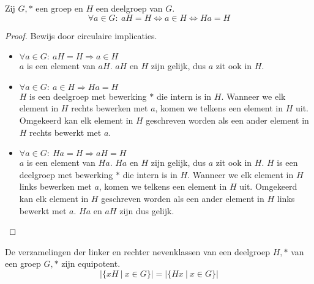 \documentclass[main.tex]{subfiles}
\begin{document}
\begin{ei}
  \label{ei:nevenklasse-eigen-element-gelijk}
  Zij $G,*$ een groep en $H$ een deelgroep van $G$.
  \[ \forall a \in G:\ aH = H \Leftrightarrow a \in H \Leftrightarrow Ha = H \]

  \begin{proof}
    Bewijs door circulaire implicaties.
    \begin{itemize}
    \item $\forall a \in G:\ aH = H \Rightarrow a \in H$\\
      $a$ is een element van $aH$. $aH$ en $H$ zijn gelijk, dus $a$ zit ook in $H$.
    \item $\forall a \in G:\ a \in H \Rightarrow Ha = H$\\
      $H$ is een deelgroep met bewerking $*$ die intern is in $H$.
      Wanneer we elk element in $H$ rechts bewerken met $a$, komen we telkens een element in $H$ uit.
      Omgekeerd kan elk element in $H$ geschreven worden als een ander element in $H$ rechts bewerkt met $a$.
    \item $\forall a \in G:\ Ha = H \Rightarrow aH = H$\\
      $a$ is een element van $Ha$. $Ha$ en $H$ zijn gelijk, dus $a$ zit ook in $H$.
      $H$ is een deelgroep met bewerking $*$ die intern is in $H$.
      Wanneer we elk element in $H$ links bewerken met $a$, komen we telkens een element in $H$ uit.
      Omgekeerd kan elk element in $H$ geschreven worden als een ander element in $H$ links bewerkt met $a$.
      $Ha$ en $aH$ zijn dus gelijk.
    \end{itemize}
  \end{proof}
\end{ei}

\begin{st}
  De verzamelingen der linker en rechter nevenklassen van een deelgroep $H,*$ van een groep $G,*$ zijn equipotent.
  \[ |\{ xH\ |\ x \in G \}| = |\{ Hx\ |\ x \in G \}| \]
\end{st}
\end{document}

